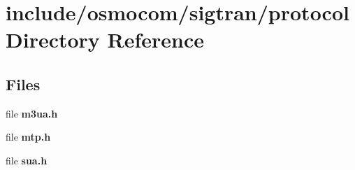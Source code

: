 \section{include/osmocom/sigtran/protocol Directory Reference}
\label{dir_555f705a94ad9dab648a26dddeca006d}
\subsection*{Files}
\begin{DoxyCompactItemize}
\item 
file {\bf m3ua.\+h}
\item 
file {\bf mtp.\+h}
\item 
file {\bf sua.\+h}
\end{DoxyCompactItemize}
